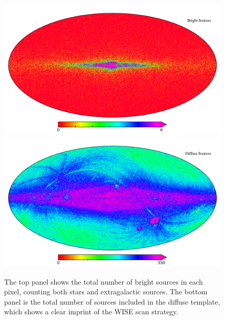 \documentclass{aa}
\begin{document}
\begin{figure}
  \centering
  \includegraphics[width=\columnwidth]{figs/sourcecount/source_count.pdf}\\
  \includegraphics[width=\columnwidth]{figs/sourcecount/diffuse_count.pdf}
  \caption{The top panel shows the total number of bright sources in each pixel, counting both stars and extragalactic sources. The bottom panel is the total number of sources included in the diffuse template, which shows a clear imprint of the WISE scan strategy.}
  \label{fig:starcount}
\end{figure}
\end{document}
